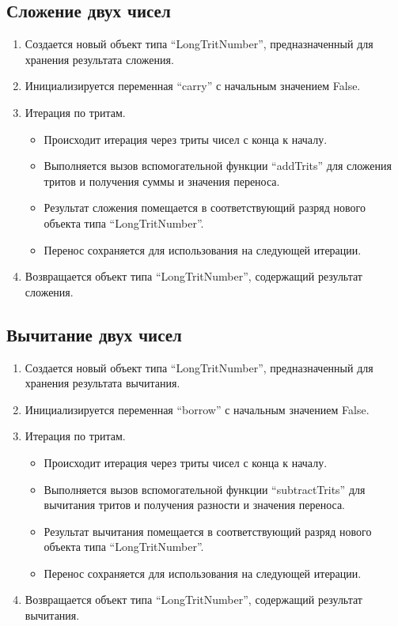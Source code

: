 \documentclass[12pt, a4paper]{article}
\begin{document}
\subsection{Сложение двух чисел}
\begin{enumerate}
    \item Создается новый объект типа ``LongTritNumber'', предназначенный для хранения результата сложения.
    \item Инициализируется переменная ``carry'' с начальным значением False.
    \item Итерация по тритам.
    \begin{itemize}
        \item[---] Происходит итерация через триты чисел с конца к началу.
        \item[---] Выполняется вызов вспомогательной функции ``addTrits'' для сложения тритов и получения суммы и значения переноса.
        \item[---] Результат сложения помещается в соответствующий разряд нового объекта типа ``LongTritNumber''.
        \item[---] Перенос сохраняется для использования на следующей итерации.
    \end{itemize}
    \item  Возвращается объект типа ``LongTritNumber'', содержащий результат сложения.
\end{enumerate}

\subsection{Вычитание двух чисел}
\begin{enumerate}
    \item Создается новый объект типа ``LongTritNumber'', предназначенный для хранения результата вычитания.
    \item Инициализируется переменная ``borrow'' с начальным значением False.
    \item Итерация по тритам.
    \begin{itemize}
        \item[---] Происходит итерация через триты чисел с конца к началу.
        \item[---] Выполняется вызов вспомогательной функции ``subtractTrits'' для вычитания тритов и получения разности и значения переноса.
        \item[---] Результат вычитания помещается в соответствующий разряд нового объекта типа ``LongTritNumber''.
        \item[---] Перенос сохраняется для использования на следующей итерации.
    \end{itemize}
    \item  Возвращается объект типа ``LongTritNumber'', содержащий результат вычитания.
\end{enumerate}
\end{document}
